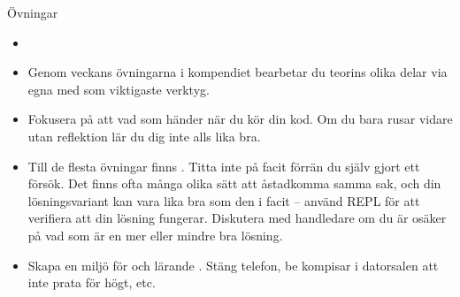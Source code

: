 \ifkompendium\else  %
\begin{SlideExtra}{Övningar}\SlideFontSmall
\begin{itemize}
  \item {}

\item Genom veckans övningarna i kompendiet bearbetar du teorins olika delar via egna  med  som viktigaste verktyg.

\item Fokusera på att  vad som händer när du kör din kod. Om du bara rusar vidare utan reflektion lär du dig inte alls lika bra.

\item Till de flesta övningar finns . Titta inte på facit förrän du själv gjort ett försök. Det finns ofta många olika sätt att åstadkomma samma sak, och din lösningsvariant kan vara lika bra som den i facit -- använd REPL för att verifiera att din lösning fungerar. Diskutera med handledare om du är osäker på vad som är en mer eller mindre bra lösning.

\item Skapa en miljö för  och lärande . Stäng telefon, be kompisar i datorsalen att inte prata för högt, etc.
\end{itemize}
\end{SlideExtra}

